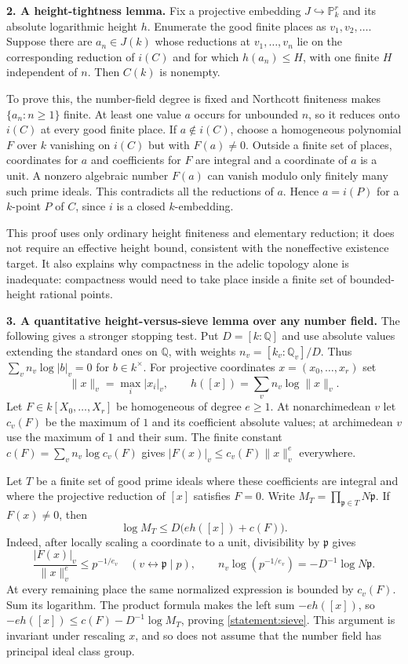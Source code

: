 \documentclass[11pt,a4paper]{article}
\newcommand{\Q}{\mathbb{Q}}
\newcommand{\PP}{\mathbb P}
\begin{document}
\textbf{2. A height-tightness lemma.}
Fix a projective embedding $J\hookrightarrow\PP^r_k$ and its absolute
logarithmic height $h$. Enumerate the good finite places as
$v_1,v_2,\ldots$. Suppose there are $a_n\in J(k)$ whose reductions at
$v_1,\ldots,v_n$ lie on the corresponding reduction of $i(C)$ and for
which $h(a_n)\le H$, with one finite $H$ independent of $n$. Then $C(k)$
is nonempty.

To prove this, the number-field degree is fixed and Northcott finiteness
makes $\{a_n:n\ge1\}$ finite. At least one value $a$ occurs for unbounded
$n$, so it reduces onto $i(C)$ at every good finite place. If
$a\notin i(C)$, choose a homogeneous polynomial $F$ over $k$ vanishing
on $i(C)$ but with $F(a)\ne0$. Outside a finite set of places, coordinates
for $a$ and coefficients for $F$ are integral and a coordinate of $a$ is
a unit. A nonzero algebraic number $F(a)$ can vanish modulo only finitely
many such prime ideals. This contradicts all the reductions of $a$.
Hence $a=i(P)$ for a $k$-point $P$ of $C$, since $i$ is a closed
$k$-embedding.

This proof uses only ordinary height finiteness and elementary reduction;
it does not require an effective height bound, consistent with the
noneffective existence target. It also explains why compactness in the
adelic topology alone is inadequate: compactness would need to take place
inside a finite set of bounded-height rational points.

\textbf{3. A quantitative height-versus-sieve lemma over any number field.}
The following gives a stronger stopping test. Put $D=[k:\Q]$ and use
absolute values extending the standard ones on $\Q$, with weights
$n_v=[k_v:\Q_v]/D$. Thus $\sum_v n_v\log|b|_v=0$ for $b\in k^\times$.
For projective coordinates $x=(x_0,\ldots,x_r)$ set
\[
 \|x\|_v=\max_i|x_i|_v,\qquad h([x])=\sum_v n_v\log\|x\|_v.
\]
Let $F\in k[X_0,\ldots,X_r]$ be homogeneous of degree $e\ge1$.
At nonarchimedean $v$ let $c_v(F)$ be the maximum of $1$ and its coefficient
absolute values; at archimedean $v$ use the maximum of $1$ and their sum.
The finite constant
$c(F)=\sum_v n_v\log c_v(F)$ gives
$|F(x)|_v\le c_v(F)\|x\|_v^e$ everywhere.

Let $T$ be a finite set of good prime ideals where these coefficients are
integral and where the projective reduction of $[x]$ satisfies $F=0$.
Write $M_T=\prod_{\mathfrak p\in T}N\mathfrak p$. If $F(x)\ne0$, then
\begin{equation}\label{statement:sieve}
 \log M_T\le D\bigl(eh([x])+c(F)\bigr).
\end{equation}
Indeed, after locally scaling a coordinate to a unit, divisibility by
$\mathfrak p$ gives
\[
 \frac{|F(x)|_v}{\|x\|_v^e}\le p^{-1/e_v}
 \quad(v\leftrightarrow\mathfrak p\mid p),
 \qquad
 n_v\log(p^{-1/e_v})=-D^{-1}\log N\mathfrak p.
\]
At every remaining place the same normalized expression is bounded by
$c_v(F)$. Sum its logarithm. The product formula makes the left sum
$-eh([x])$, so
$-eh([x])\le c(F)-D^{-1}\log M_T$, proving \eqref{statement:sieve}.
This argument is invariant under rescaling $x$, and so does not assume
that the number field has principal ideal class group.
\end{document}
